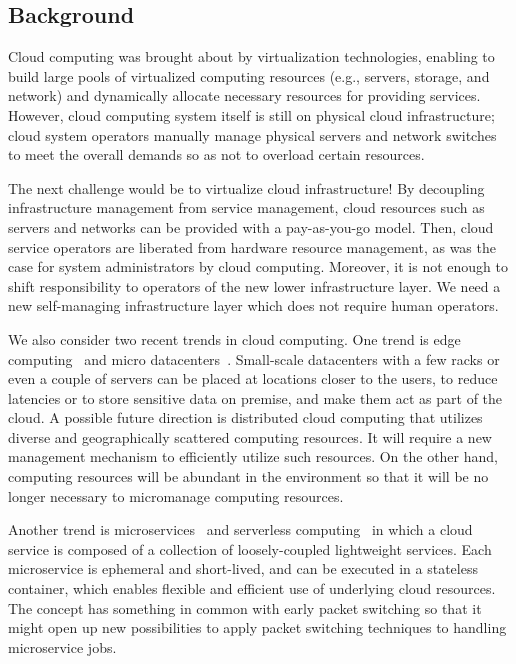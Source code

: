 \subsection{Background}

Cloud computing was brought about by virtualization technologies,
enabling to build large pools of virtualized computing resources (e.g.,
servers, storage, and network) and dynamically allocate necessary resources
for providing services.
However, cloud computing system itself is still on physical cloud
infrastructure; cloud system operators manually manage
physical servers and network switches to meet the overall demands
so as not to overload certain resources.

The next challenge would be to virtualize cloud infrastructure!
By decoupling infrastructure management from service management,
cloud resources such as servers and networks can be provided with a
pay-as-you-go model.
Then, cloud service operators are liberated from hardware resource management,
as was the case for system administrators by cloud computing.
Moreover, it is not enough to shift responsibility to operators of the
new lower infrastructure layer. We need a new self-managing
infrastructure layer which does not require human operators.

We also consider two recent trends in cloud computing.
One trend is edge computing~\cite{Lopez-2015} and
micro datacenters~\cite{Greenberg-2009}.
Small-scale datacenters with a few racks or even a couple of servers
can be placed at locations closer to the users, to reduce latencies
or to store sensitive data on premise, and make them act as part of
the cloud.
A possible future direction is distributed cloud computing that
utilizes diverse and geographically scattered computing resources.
It will require a new management mechanism to efficiently utilize such
resources.
On the other hand, computing resources will be abundant in the
environment so that it will be no longer necessary to micromanage
computing resources.

Another trend is microservices~\cite{nadareishvili2016microservice}
and serverless computing~\cite{Shafiei-2022} in which
a cloud service is composed of a collection of loosely-coupled
lightweight services.
Each microservice is ephemeral and short-lived, and can be executed
in a stateless container,
which enables flexible and efficient use of underlying cloud
resources.
The concept has something in common with early packet switching so
that it might open up new possibilities to apply packet switching
techniques to handling microservice jobs.

